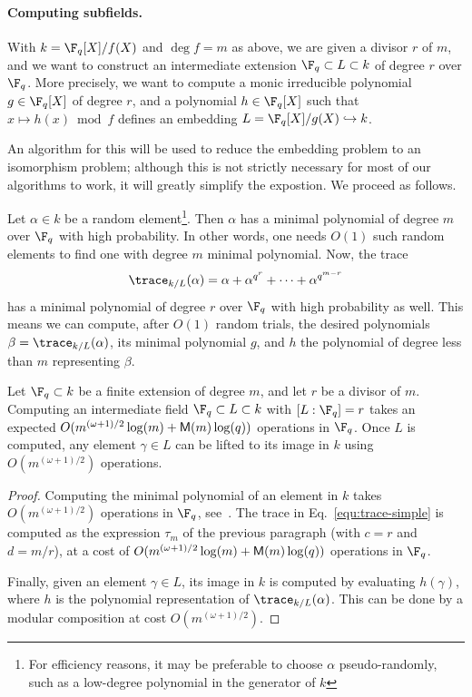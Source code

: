 \paragraph{\bf Computing subfields.}
With $k = \F_q[X]/f(X)$ and $\deg f=m$ as above, we are given a
divisor $r$ of $m$, and we want to construct an intermediate extension
$\F_q \subset L \subset k$ of degree $r$ over $\F_q$. More precisely,
we want to compute a monic irreducible polynomial $g \in \F_q[X]$ of
degree $r$, and a polynomial $h \in \F_q[X]$ such that
$x \mapsto h(x)\bmod f$ defines an embedding
$L = \F_q[X] / g(X) \hookrightarrow k$.

An algorithm for this will be used to reduce the embedding problem to
an isomorphism problem; although this is not strictly necessary for
most of our algorithms to work, it will greatly simplify the
expostion. We proceed as follows.

Let $\alpha\in k$ be a random element\footnote{For efficiency reasons,
  it may be preferable to choose $\alpha$ pseudo-randomly, such as a
  low-degree polynomial in the generator of $k$}. %
Then $\alpha$ has a minimal polynomial of degree $m$ 
over $\F_q$ with high probability. In other words, one needs $O(1)$ such random elements to find 
one with degree $m$ minimal polynomial. Now, the trace
\begin{equation}
	\label{equ:trace-simple}
	\trace_{k/L}(\alpha) = \alpha + \alpha^{q^r} + \cdots + \alpha^{q^{m - r}}
\end{equation}
has a minimal polynomial of degree $r$ over $\F_q$ with high
probability as well. This means we can compute, after $O(1)$ random
trials, the desired polynomials $\beta = \trace_{k/L}(\alpha)$,
its minimal polynomial
$g$, and $h$ the polynomial of degree less than $m$ representing $\beta$.

\begin{proposition}
	\label{prop:subfield}
	Let $\F_q \subset k$ be a finite extension of degree $m$, and
        let $r$ be a divisor of $m$.  Computing an intermediate field
        $\F_q \subset L \subset k$ with $[L:\F_q]=r$ takes an expected
        $O(m^{(\omega+1)/2}\log(m) + \mathsf{M}(m)\log(q))$ operations in $\F_q$.  Once
        $L$ is computed, any element $\gamma\in L$ can be lifted to
        its image in $k$ using $O(m^{(\omega+1)/2})$ operations.
\end{proposition}
\begin{proof}
  Computing the minimal polynomial of an element in $k$ takes
  $O(m^{(\omega+1)/2})$ operations in $\F_q$, see~\cite{shoup99}. %
  The trace in Eq.~\eqref{equ:trace-simple} is computed as the
  expression $\tau_m$ of the previous paragraph (with $c=r$ and
  $d=m/r$), at a cost of $O(m^{(\omega+1)/2}\log(m)+\mathsf{M}(m)\log(q))$
  operations in $\F_q$.
  
  Finally, given an element $\gamma\in L$, its image in $k$ is
  computed by evaluating $h(\gamma)$, where $h$ is the polynomial
  representation of $\trace_{k/L}(\alpha)$. This can be done by a
  modular composition at cost $O(m^{(\omega+1)/2})$.
\end{proof}

